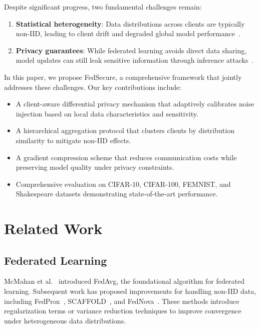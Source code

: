 \documentclass[conference]{IEEEtran}
\begin{document}
Despite significant progress, two fundamental challenges remain:

\begin{enumerate}
\item \textbf{Statistical heterogeneity}: Data distributions across clients are typically non-IID, leading to client drift and degraded global model performance~\cite{karimireddy2020scaffold}.
\item \textbf{Privacy guarantees}: While federated learning avoids direct data sharing, model updates can still leak sensitive information through inference attacks~\cite{nasr2019comprehensive}.
\end{enumerate}

In this paper, we propose FedSecure, a comprehensive framework that jointly addresses these challenges. Our key contributions include:

\begin{itemize}
\item A client-aware differential privacy mechanism that adaptively calibrates noise injection based on local data characteristics and sensitivity.
\item A hierarchical aggregation protocol that clusters clients by distribution similarity to mitigate non-IID effects.
\item A gradient compression scheme that reduces communication costs while preserving model quality under privacy constraints.
\item Comprehensive evaluation on CIFAR-10, CIFAR-100, FEMNIST, and Shakespeare datasets demonstrating state-of-the-art performance.
\end{itemize}

\section{Related Work}

\subsection{Federated Learning}

McMahan et al.~\cite{mcmahan2017communication} introduced FedAvg, the foundational algorithm for federated learning. Subsequent work has proposed improvements for handling non-IID data, including FedProx~\cite{li2020federated}, SCAFFOLD~\cite{karimireddy2020scaffold}, and FedNova~\cite{wang2020tackling}. These methods introduce regularization terms or variance reduction techniques to improve convergence under heterogeneous data distributions.
\end{document}

